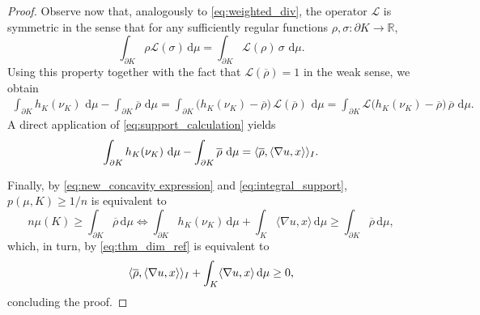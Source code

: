 \documentclass[10pt,a4paper]{amsart}
\newcommand{\R}{\mathbb{R}}
\newcommand{\di}{\, \mathrm{d}}
\newcommand{\rhobar}{\overline{\rho}}
\begin{document}
\begin{proof}
Observe now that, analogously to \eqref{eq:weighted_div}, the operator $\mathcal{L}$ is symmetric in the sense that for any sufficiently regular functions $\rho,\sigma: \partial K \to \R$,
\[
\int_{\partial K} \rho\mathcal{L}(\sigma)\di \mu
=
\int_{\partial K} \mathcal{L}(\rho)\,\sigma\,\di \mu.
\]
Using this property together with the fact that $\mathcal{L}(\overline{\rho})=1$ in the weak sense, we obtain
\begin{align*}
\int_{\partial K}h_{K}(\nu_{K})\,\di\mu
-
\int_{\partial K}\overline{\rho}\,\di \mu
=
\int_{\partial K} \big(h_{K}(\nu_{K})-\overline{\rho}\big)\,\mathcal{L}(\overline{\rho})\,\di \mu 
=
\int_{\partial K} \mathcal{L}\big(h_{K}(\nu_{K})-\overline{\rho}\big)\,\overline{\rho}\,\di \mu.
\end{align*}
A direct application of \eqref{eq:support_calculation} yields
\begin{equation} \label{eq:thm_dim_ref}
    \int_{\partial K}h_{K}(\nu_{K})\,\di\mu- \int_{\partial K} \overline{\rho}\,\di \mu = \langle \overline{\rho}, \langle \nabla u , x \rangle \rangle_{\rm I}.
\end{equation}

Finally, by \eqref{eq:new_concavity expression} and \eqref{eq:integral_support}, $p(\mu,K)\geq 1/n$ is equivalent to
\[n\mu(K) \geq \int_{\partial K}\rhobar \di \mu  \Leftrightarrow \int_{\partial K} h_K(\nu_K) \di \mu +\int_{K} \langle \nabla u,x \rangle \di \mu \geq \int_{\partial K} \rhobar \di \mu,\]
which, in turn, by \eqref{eq:thm_dim_ref} is equivalent to \[\langle \rhobar,\langle \nabla u, x \rangle \rangle_{\rm I}+\int_K \langle \nabla u, x \rangle \di \mu \geq 0,\] concluding the proof.
\end{proof}
\end{document}
